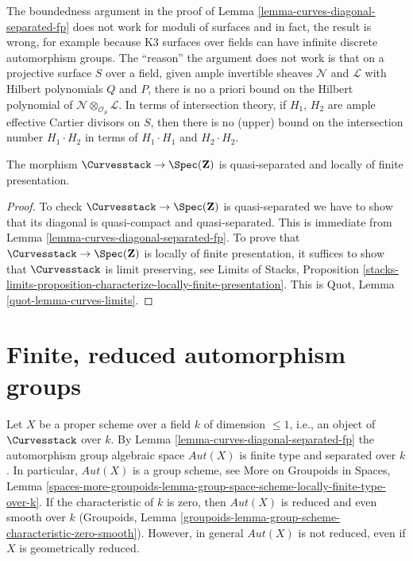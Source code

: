 \begin{remark}
\label{remark-boundedness-aut-does-not-work-surfaces}
The boundedness argument in the proof of
Lemma \ref{lemma-curves-diagonal-separated-fp}
does not work for moduli of surfaces and in fact,
the result is wrong, for example because K3 surfaces
over fields can have infinite discrete automorphism groups.
The ``reason'' the argument does not work is that on a
projective surface $S$ over a field,
given ample invertible sheaves $\mathcal{N}$
and $\mathcal{L}$ with Hilbert polynomials $Q$ and $P$,
there is no a priori bound on the Hilbert polynomial
of $\mathcal{N} \otimes_{\mathcal{O}_S} \mathcal{L}$.
In terms of intersection theory, if $H_1$, $H_2$ are ample effective
Cartier divisors on $S$,
then there is no (upper) bound on the intersection number $H_1 \cdot H_2$
in terms of $H_1 \cdot H_1$ and $H_2 \cdot H_2$.
\end{remark}

\begin{lemma}
\label{lemma-curves-qs-lfp}
The morphism $\Curvesstack \to \Spec(\mathbf{Z})$ is quasi-separated and
locally of finite presentation.
\end{lemma}

\begin{proof}
To check $\Curvesstack \to \Spec(\mathbf{Z})$ is quasi-separated we have to
show that its diagonal is quasi-compact and quasi-separated.
This is immediate from Lemma \ref{lemma-curves-diagonal-separated-fp}.
To prove that $\Curvesstack \to \Spec(\mathbf{Z})$ is locally of finite
presentation, it suffices to show that $\Curvesstack$
is limit preserving, see Limits of Stacks, Proposition
\ref{stacks-limits-proposition-characterize-locally-finite-presentation}.
This is Quot, Lemma \ref{quot-lemma-curves-limits}.
\end{proof}








\section{Finite, reduced automorphism groups}
\label{section-finite-aut}

\noindent
Let $X$ be a proper scheme over a field $k$ of dimension $\leq 1$, i.e.,
an object of $\Curvesstack$ over $k$.
By Lemma \ref{lemma-curves-diagonal-separated-fp}
the automorphism group algebraic space $\mathit{Aut}(X)$
is finite type and separated over $k$.
In particular, $\mathit{Aut}(X)$ is a group scheme, see
More on Groupoids in Spaces, Lemma
\ref{spaces-more-groupoids-lemma-group-space-scheme-locally-finite-type-over-k}.
If the characteristic of $k$ is zero, then $\mathit{Aut}(X)$
is reduced and even smooth over $k$ (Groupoids, Lemma
\ref{groupoids-lemma-group-scheme-characteristic-zero-smooth}).
However, in general $\mathit{Aut}(X)$ is not reduced, even
if $X$ is geometrically reduced.


